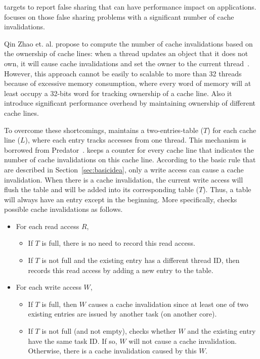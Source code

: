 \Cheetah{} targets to report false sharing that can have performance impact on applications. \Cheetah{} focuses on those false sharing problems with a significant number of cache invalidations.  

Qin Zhao et. al. propose to compute the number of cache invalidations based on the ownership of cache lines: when a thread updates an object that it does not own, it will cause cache invalidations and set the owner to the current thread~\cite{qinzhao}. However, this approach cannot be easily to scalable to more than 32 threads because of excessive memory consumption, where every word of memory will at least occupy a 32-bits word for tracking ownership of a cache line. Also it introduce significant performance overhead by maintaining ownership of different cache lines. 

To overcome these shortcomings, \Cheetah{} maintains a two-entries-table ($T$) for each cache line ($L$), where each entry tracks accesses from one thread. This mechanism is borrowed from Predator~\cite{Predator}. \Cheetah{} keeps a counter for every cache line that indicates the number of cache invalidations on this cache line.  
According to the basic rule that are described in Section~\ref{sec:basicidea}, only a write access can cause a cache invalidation. When there is a cache invalidation, the current write access will flush the table and will be added into its corresponding table ($T$). Thus, a table will always have an entry except in the beginning. More specifically, \cheetah{} checks possible cache invalidations as follows.
 
\begin{itemize}
\item
  For each read access $R$,
  \begin{itemize}
    \item
      If $T$ is full, there is no need to record this read access.
    \item
      If $T$ is not full and the existing entry has a different thread ID, 
      then \cheetah{} records this read access by adding a new entry to the table.
  \end{itemize}
\item
  For each write access $W$,  
  \begin{itemize}
    \item
      If $T$ is full, then $W$ causes a cache invalidation since at least one of two existing entries are issued by another task (on another core).
    \item
      If $T$ is not full (and not empty),
      \cheetah{} checks whether $W$ and the existing entry have the same task ID. If
      so, $W$ will not cause a cache invalidation. Otherwise, there is a cache invalidation caused by this $W$.
  \end{itemize}
\end{itemize}

